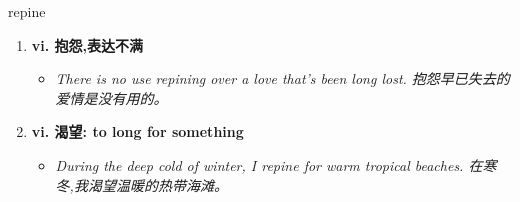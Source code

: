 
\begin{frame}
{\huge repine}
\begin{center}
\begin{enumerate}\Large
  \item \textbf{vi. 抱怨,表达不满}
  \begin{itemize}
    \item \em{\Large{There is no use repining over a love that's been long lost. 抱怨早已失去的爱情是没有用的。}}
  \end{itemize}
  \item \textbf{vi. 渴望: to long for something}
  \begin{itemize}
    \item \em{\Large{During the deep cold of winter, I repine for warm tropical beaches. 在寒冬,我渴望温暖的热带海滩。}}
  \end{itemize}
\end{enumerate}
\end{center}
\end{frame}
